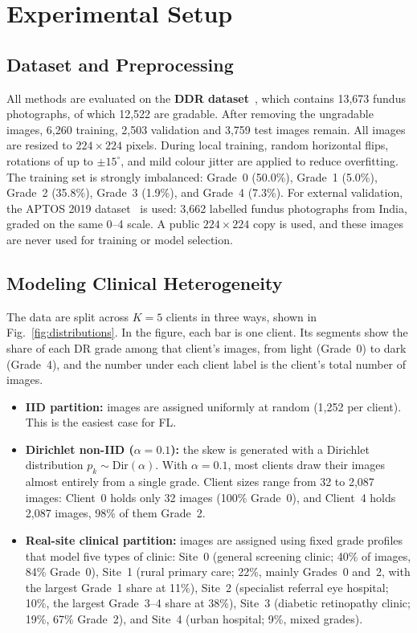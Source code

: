 \section{Experimental Setup}
\label{sec:experiments}

\subsection{Dataset and Preprocessing}

All methods are evaluated on the \textbf{DDR dataset}~\cite{li2019ddr}, which
contains 13,673 fundus photographs, of which 12,522 are gradable. After removing
the ungradable images, 6,260 training, 2,503 validation and 3,759 test images
remain. All images are resized to $224 \times 224$ pixels. During local training,
random horizontal flips, rotations of up to $\pm 15^{\circ}$, and mild colour
jitter are applied to reduce overfitting. The training set is strongly imbalanced:
Grade~0 (50.0\%), Grade~1 (5.0\%), Grade~2 (35.8\%), Grade~3 (1.9\%), and Grade~4
(7.3\%). For external validation, the APTOS 2019 dataset~\cite{aptos2019} is used:
3,662 labelled fundus photographs from India, graded on the same 0--4
scale. A public $224 \times 224$ copy is used, and these images are never used for
training or model selection.

\subsection{Modeling Clinical Heterogeneity}

The data are split across $K = 5$ clients in three ways, shown in
Fig.~\ref{fig:distributions}. In the figure, each bar is one client. Its segments
show the share of each DR grade among that client's images, from light (Grade~0)
to dark (Grade~4), and the number under each client label is the client's total
number of images.
\begin{itemize}[leftmargin=*,noitemsep,topsep=2pt]
  \item \textbf{IID partition:} images are assigned uniformly at random (1,252 per
  client). This is the easiest case for FL.
  \item \textbf{Dirichlet non-IID ($\alpha=0.1$):} the skew is generated with a
  Dirichlet distribution $p_k \sim \mathrm{Dir}(\alpha)$. With $\alpha=0.1$, most
  clients draw their images almost entirely from a single grade. Client sizes
  range from 32 to 2,087 images: Client~0 holds only 32 images (100\% Grade~0),
  and Client~4 holds 2,087 images, 98\% of them Grade~2.
  \item \textbf{Real-site clinical partition:} images are assigned using fixed
  grade profiles that model five types of clinic: Site~0 (general screening
  clinic; 40\% of images, 84\% Grade~0), Site~1 (rural primary care; 22\%, mainly
  Grades~0 and~2, with the largest Grade~1 share at 11\%), Site~2 (specialist
  referral eye hospital; 10\%, the largest Grade~3--4 share at 38\%), Site~3
  (diabetic retinopathy clinic; 19\%, 67\% Grade~2), and Site~4 (urban hospital;
  9\%, mixed grades).
\end{itemize}

